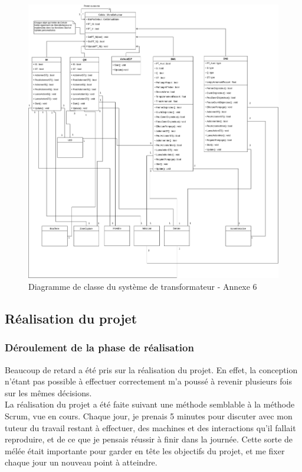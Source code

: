 \documentclass[a4paper]{article}
\begin{document}
    \begin{figure}[H]
        \includegraphics[scale=0.3]{img/DiagClassCellules}
        \caption{Diagramme de classe du système de transformateur - Annexe 6}
    \end{figure}  

    \subsection{Réalisation du projet}

    \subsubsection{Déroulement de la phase de réalisation}
    Beaucoup de retard a été pris sur la réalisation du projet. En effet, la conception n'étant pas possible à effectuer correctement m'a poussé à revenir plusieurs fois sur les mêmes décisions. \\

    La réalisation du projet a été faite suivant une méthode semblable à la méthode Scrum, vue en cours. Chaque jour, je prenais 5 minutes pour discuter avec mon tuteur du travail restant à effectuer, des machines et des interactions qu'il fallait reproduire, et de ce que je pensais réussir à finir dans la journée. Cette sorte de mélée était importante pour garder en tête les objectifs du projet, et me fixer chaque jour un nouveau point à atteindre. \\
\end{document}
